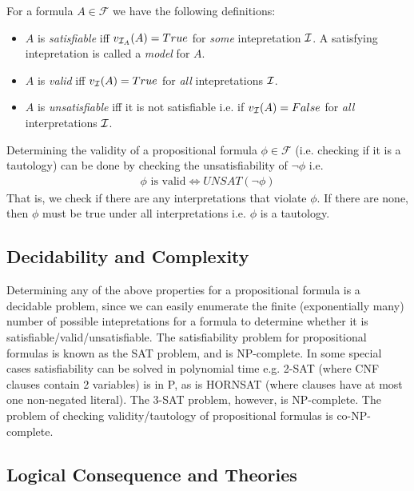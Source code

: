 \documentclass[10pt]{article}
\begin{document}
For a formula $A \in \mathcal{F}$ we have the following definitions:
\begin{itemize}
    \item $A$ is \textit{satisfiable} iff $v_{\mathcal{I}_{A}}(A) = True$ for \textit{some} intepretation $\mathcal{I}$. A satisfying intepretation is called a \textit{model} for $A$.
    \item $A$ is \textit{valid} iff $v_{\mathcal{I}}(A)=True$ for \textit{all} intepretations $\mathcal{I}$.
    \item $A$ is \textit{unsatisfiable} iff it is not satisfiable i.e. if $v_{\mathcal{I}}(A)=False$ for \textit{all} interpretations $\mathcal{I}$.
\end{itemize}

Determining the validity of a propositional formula $\phi \in \mathcal{F}$ (i.e. checking if it is a tautology) can be done by checking the unsatisfiability of $\neg \phi$ i.e.
\begin{align*}
    \phi \text{ is valid} \iff UNSAT(\neg \phi)
\end{align*}
That is, we check if there are any interpretations that violate $\phi$. If there are none, then $\phi$ must be true under all interpretations i.e. $\phi$ is a tautology.

\subsection{Decidability and Complexity}

Determining any of the above properties for a propositional formula is a decidable problem, since we can easily enumerate the finite (exponentially many) number of possible intepretations for a formula to determine whether it is satisfiable/valid/unsatisfiable. The satisfiability problem for propositional formulas is known as the SAT problem, and is NP-complete. In some special cases satisfiability can be solved in polynomial time e.g. 2-SAT (where CNF clauses contain 2 variables) is in P, as is HORNSAT (where clauses have at most one non-negated literal). The 3-SAT problem, however, is NP-complete. The problem of checking validity/tautology of propositional formulas is co-NP-complete.

\subsection{Logical Consequence and Theories}
\end{document}
